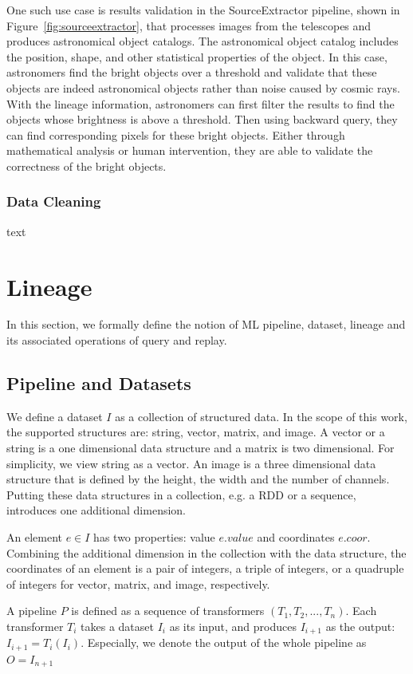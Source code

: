 \documentclass{sig-alternate}
\begin{document}
One such use case is results validation in the SourceExtractor pipeline, shown in Figure~\ref{fig:sourceextractor},
that processes images from the telescopes and produces astronomical object catalogs. 
The astronomical object catalog includes the position, shape, and other statistical properties of the object.
In this case, astronomers find the bright objects over a threshold and validate that these objects are indeed astronomical objects rather
than noise caused by cosmic rays.
With the lineage information, astronomers can first filter the results to find the objects whose brightness is above a threshold.
Then using backward query, they can find corresponding pixels for these bright objects. 
Either through mathematical analysis or human intervention, they are able to validate the correctness of the bright objects.

\subsubsection{Data Cleaning}
text

\section{Lineage}
\label{sec:Lin}
In this section, we formally define the notion of ML pipeline, dataset, lineage and its associated operations of query and replay.

\subsection{Pipeline and Datasets}
\label{sec:Lin-Pipe-Data}
We define a dataset $I$ as a collection of structured data. In the scope of this work, the supported structures are: 
string, vector, matrix, and image. A vector or a string is a one dimensional data structure and a matrix is two dimensional. 
For simplicity, we view string as a vector.
An image is a three dimensional data structure that is defined by the height, the width and the number
of channels. Putting these data structures in a collection, e.g. a RDD or a sequence, introduces one additional dimension.

An element $e \in I$ has two properties: value $e.value$ and coordinates $e.coor$. 
Combining the additional dimension in the collection with the data structure, 
the coordinates of an element is a pair of integers, a triple of integers, or a quadruple of integers
for vector, matrix, and image, respectively.

A pipeline $P$ is defined as a sequence of transformers $(T_1, T_2, ..., T_n)$. 
Each transformer $T_i$ takes a dataset $I_i$ as its input, and produces $I_{i+1}$ as the output: 
$I_{i+1} = T_i(I_i)$. 
Especially, we denote the output of the whole pipeline as $O = I_{n+1}$
\end{document}
